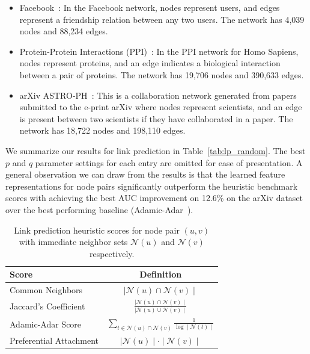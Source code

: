 \begin{itemize}[noitemsep,nolistsep]
	\item Facebook~\cite{snapnets}: In the Facebook network, nodes represent users, and edges represent a friendship relation between any two users. The network has 4,039 nodes and 88,234 edges.
	\item Protein-Protein Interactions (PPI)~\cite{biogrid}: In the PPI network for Homo Sapiens, nodes represent proteins, and an edge indicates a biological interaction between a pair of proteins. The network has 19,706 nodes and 390,633 edges.
	\item arXiv ASTRO-PH~\cite{snapnets}: This is a collaboration network generated from papers submitted to the e-print arXiv where nodes represent scientists, and an edge is present between two scientists if they have collaborated in a paper. The network has 18,722 nodes and 198,110 edges.
\end{itemize}

 We summarize our results for link prediction in Table~\ref{tab:lp_random}. The best $p$ and $q$ parameter settings for each \nodevec entry are omitted for ease of presentation. A general observation we can draw from the results is that the learned feature representations for node pairs significantly outperform the heuristic benchmark scores with \nodevec achieving the best AUC improvement on 12.6\% on the arXiv dataset over the best performing baseline (Adamic-Adar~\cite{adamicadar}). 

\begin{table}
\centering
\begin{tabular}{l|c}
\textbf{Score} & \textbf{Definition} \\ \hline
Common Neighbors & $\mid \mathcal{N}(u) \cap \mathcal{N}(v) \mid$ \\
Jaccard's Coefficient & $\frac{\mid \mathcal{N}(u) \cap \mathcal{N}(v) \mid}{\mid \mathcal{N}(u) \cup \mathcal{N}(v) \mid}$ \\
Adamic-Adar Score & $\sum_{t \in \mathcal{N}(u) \cap \mathcal{N}(v)} \frac{1}{\log \mid \mathcal{N}(t) \mid}$ \\
Preferential Attachment & $\mid \mathcal{N}(u) \mid \cdot \mid \mathcal{N}(v) \mid$
\end{tabular}
\vspace{-0.2cm}
\caption{Link prediction heuristic scores for node pair $(u, v)$ with immediate neighbor sets $\mathcal{N}(u)$ and $\mathcal{N}(v)$ respectively.}
\label{tab:lp_scores}
\vspace{-0.4cm}
\end{table}

